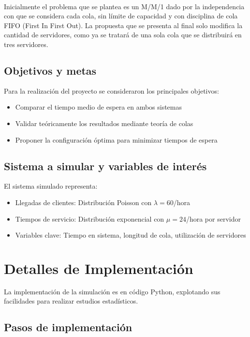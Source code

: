 \documentclass{article}
\begin{document}
\

Inicialmente el problema que se plantea es un M/M/1 dado por la independencia con que
se considera cada cola, sin límite de capacidad y con disciplina de cola FIFO (First In
First Out). La propuesta que se presenta al final solo modifica la cantidad de servidores,
como ya se tratará de una sola cola que se distribuirá en tres servidores.

\subsection{Objetivos y metas}
Para la realización del proyecto se consideraron los principales objetivos:

\begin{itemize}
\item Comparar el tiempo medio de espera en ambos sistemas
\item Validar teóricamente los resultados mediante teoría de colas
\item Proponer la configuración óptima para minimizar tiempos de espera
\end{itemize}

\subsection{Sistema a simular y variables de interés}
El sistema simulado representa:
\begin{itemize}
\item Llegadas de clientes: Distribución Poisson con $\lambda = 60$/hora
\item Tiempos de servicio: Distribución exponencial con $\mu = 24$/hora por servidor
\item Variables clave: Tiempo en sistema, longitud de cola, utilización de servidores
\end{itemize}

\newpage

\section{Detalles de Implementación}\label{sec:implementacion}

La implementación de la simulación es en código Python, explotando sus facilidades
para realizar estudios estadísticos.

\subsection{Pasos de implementación}
\end{document}
